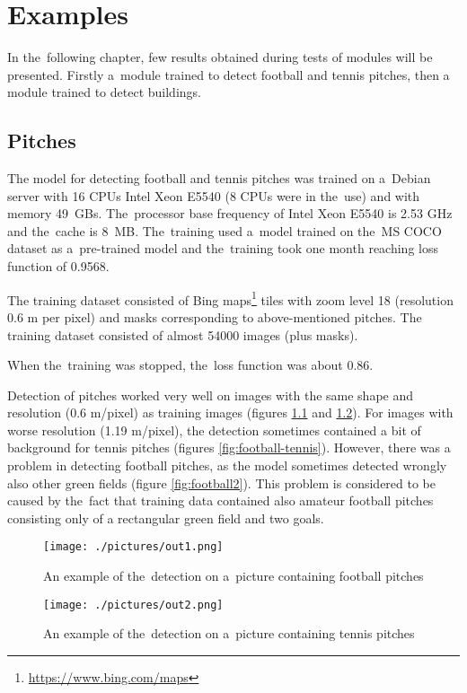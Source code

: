 \chapter{Examples}
\label{examples}

In the~following chapter, few results obtained during tests of modules will be
presented. Firstly a~module trained to detect football and tennis pitches, then 
a module trained to detect buildings.

\section{Pitches}

The model for detecting football and tennis pitches was trained on a~Debian 
server with 16 CPUs Intel Xeon E5540 (8 CPUs were in the~use) and with memory
49~GBs. The~processor base frequency of Intel Xeon E5540 is 2.53 GHz and
the~cache is 8~MB. The~training used a~model trained on the~MS COCO dataset as
a~pre-trained model and the~training took one month reaching loss function of
0.9568.

The training dataset consisted of Bing 
maps\footnote{\url{https://www.bing.com/maps}} tiles with zoom level 18 
(resolution 0.6 m per pixel) and masks corresponding to above-mentioned
pitches. The training dataset consisted of almost 54000 images (plus masks).

When the~training was stopped, the~loss function was about 0.86.

Detection of pitches worked very well on images with the same shape and
resolution (0.6 m/pixel) as training images (figures \ref{fig:football1} and
\ref{fig:tennis1}). For images with worse resolution (1.19 m/pixel), the
detection sometimes contained a bit of background for tennis pitches (figures
\ref{fig:football-tennis}). However, there
was a problem in detecting football pitches, as the model sometimes detected
wrongly also other green fields (figure \ref{fig:football2}). This problem is
considered to be caused by the~fact that training data contained also amateur
football pitches consisting only of a rectangular green field and two goals.

\begin{figure}[H]
   \centering
	\texttt{[image: ./pictures/out1.png]}
	\caption[Detection of football pitches]{An example of the~detection on
	a~picture containing football pitches}
      \label{fig:football1}
\end{figure}

\begin{figure}[H]
   \centering
	\texttt{[image: ./pictures/out2.png]}
	\caption[Detection of tennis pitches]{An example of the~detection on
	a~picture containing tennis pitches}
      \label{fig:tennis1}
\end{figure}

